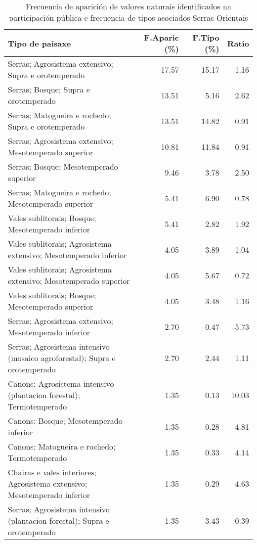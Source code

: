 \begin{table}[p]
\centering
\caption{Frecuencia de aparición de valores naturais identificados na participación pública e frecuencia de tipos asociados Serras Orientais} 
\label{vsixotnat5}
\begin{tabular}{lrrr}
  \hline
Tipo de paisaxe & F.Aparic (\%) & F.Tipo (\%) & Ratio \\ 
  \hline
Serras; Agrosistema extensivo; Supra e orotemperado & 17.57 & 15.17 & 1.16 \\ 
  Serras; Bosque; Supra e orotemperado & 13.51 & 5.16 & 2.62 \\ 
  Serras; Matogueira e rochedo; Supra e orotemperado & 13.51 & 14.82 & 0.91 \\ 
  Serras; Agrosistema extensivo; Mesotemperado superior & 10.81 & 11.84 & 0.91 \\ 
  Serras; Bosque; Mesotemperado superior & 9.46 & 3.78 & 2.50 \\ 
  Serras; Matogueira e rochedo; Mesotemperado superior & 5.41 & 6.90 & 0.78 \\ 
  Vales sublitorais; Bosque; Mesotemperado inferior & 5.41 & 2.82 & 1.92 \\ 
  Vales sublitorais; Agrosistema extensivo; Mesotemperado inferior & 4.05 & 3.89 & 1.04 \\ 
  Vales sublitorais; Agrosistema extensivo; Mesotemperado superior & 4.05 & 5.67 & 0.72 \\ 
  Vales sublitorais; Bosque; Mesotemperado superior & 4.05 & 3.48 & 1.16 \\ 
  Serras; Agrosistema extensivo; Mesotemperado inferior & 2.70 & 0.47 & 5.73 \\ 
  Serras; Agrosistema intensivo (mosaico agroforestal); Supra e orotemperado & 2.70 & 2.44 & 1.11 \\ 
  Canons; Agrosistema intensivo (plantacion forestal); Termotemperado & 1.35 & 0.13 & 10.03 \\ 
  Canons; Bosque; Mesotemperado inferior & 1.35 & 0.28 & 4.81 \\ 
  Canons; Matogueira e rochedo; Termotemperado & 1.35 & 0.33 & 4.14 \\ 
  Chairas e vales interiores; Agrosistema extensivo; Mesotemperado inferior & 1.35 & 0.29 & 4.63 \\ 
  Serras; Agrosistema intensivo (plantacion forestal); Supra e orotemperado & 1.35 & 3.43 & 0.39 \\ 
   \hline
\end{tabular}
\end{table}
